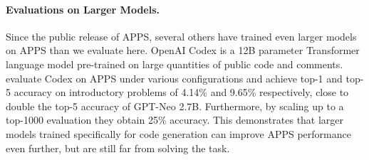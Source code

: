 \paragraph{Evaluations on Larger Models.}
Since the public release of APPS, several others have trained even larger models on APPS than we evaluate here. OpenAI Codex is a 12B parameter Transformer language model pre-trained on large quantities of public code and comments. \citet{chen2021evaluating} evaluate Codex on APPS under various configurations and achieve top-1 and top-5 accuracy on introductory problems of 4.14\% and 9.65\% respectively, close to double the top-5 accuracy of GPT-Neo 2.7B. Furthermore, by scaling up to a top-1000 evaluation they obtain 25\% accuracy. This demonstrates that larger models trained specifically for code generation can improve APPS performance even further, but are still far from solving the task.